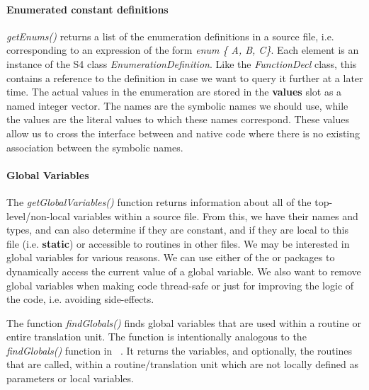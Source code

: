 \documentclass[article]{jss}
\def\R{\proglang{R}}
\def\Rpkg#1{\pkg{#1}}
\def\Rfunc#1{\textsl{#1()}}
\def\Rclass#1{\textit{#1}}
\def\Rslot#1{\textbf{#1}}
\def\Ckeyword#1{\textbf{#1}}
\def\Cexpr#1{\textsl{#1}}
\begin{document}
\paragraph{Enumerated constant definitions}
\Rfunc{getEnums} returns a list of the enumeration definitions in a
source file, i.e. corresponding to an expression of the form
\Cexpr{enum \{ A, B, C\}}. Each element is an instance of the S4 class
\Rclass{EnumerationDefinition}.  Like the \Rclass{FunctionDecl} class,
this contains a reference to the definition in case we want to query
it further at a later time.  The actual values in the enumeration are
stored in the \Rslot{values} slot as a named integer vector.  The
names are the symbolic names we should use, while the values are the
literal values to which these names correspond.  These values allow us
to cross the interface between \R{} and native code where there is no
existing association between the symbolic names.

\paragraph{Global Variables}
The \Rfunc{getGlobalVariables} function returns information about all
of the top-level/non-local variables within a source file.  From this, we have
their names and types, and can also determine if they are constant,
and if they are local to this file (i.e. \Ckeyword{static}) or
accessible to routines in other files.  We may be interested in global
variables for various reasons.  We can use either of the
\Rpkg{rdyncall} or \Rpkg{Rffi} packages to dynamically access the
current value of a global variable.  We also want to remove global
variables when making code thread-safe or just for improving the logic
of the code, i.e. avoiding side-effects.

The function \Rfunc{findGlobals} finds global variables that are used
within a routine or entire translation unit.  The function is
intentionally analogous to the \Rfunc{findGlobals} function in
\Rpkg{codetools}~\cite{bib:codetools}. It returns the variables, and
optionally, the routines that are called, within a routine/translation
unit which are not locally defined as parameters or local variables.
\end{document}
